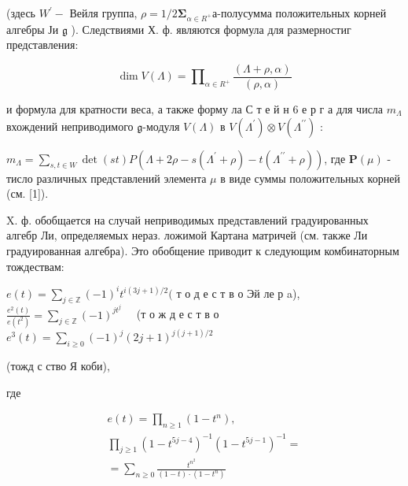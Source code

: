 \documentclass[10pt]{article}
\begin{document}
(здесь $W^{\prime}-$ Вейля группа, $\rho=1 / 2 \boldsymbol{\Sigma}_{\alpha \in R^{+}}$а-полусумма положительных корней алгебры Ји $\mathfrak{g}$ ). Следствиями Х. ф. являются формула для размерностиг представления:



\[

\operatorname{dim} V(\Lambda)=\mathbb{\prod}_{\alpha \in R^{+}} \frac{(\Lambda+\rho, \alpha)}{(\rho, \alpha)}

\]



и формула для кратности веса, а также форму ла С т е й н 6 е р г а для числа $m_{\Lambda}$ вхождений неприводимого $\mathfrak{g}$-модуля $V(\Lambda)$ в $V\left(\Lambda^{\prime}\right) \otimes V\left(\Lambda^{\prime \prime}\right)$ :



$m_{\Lambda}=\sum_{s, t \in W} \operatorname{det}(s t) P\left(\Lambda+2 \rho-s\left(\Lambda^{\prime}+\rho\right)-t\left(\Lambda^{\prime \prime}+\rho\right)\right)$, где $\boldsymbol{P}(\mu)$ - тисло различных представлений элемента $\mu$ в виде суммы положительных корней (см. [1]).



X. ф. обобщается на случай неприводимых представлений градуированных алгебр Ли, определяемых нераз. ложимой Картана матричей (см. также Ли градуированная алгебра). Это обобщение приводит к следующим комбинаторным тождествам:



$e(t)=\sum_{j \in \mathbb{Z}}(-1)^{i} t^{i(3 j+1) / 2}($ т о д е с т в о Эй ле р a), $\frac{e^{2}(t)}{e\left(t^{2}\right)}=\sum_{j \in \mathbb{Z}}(-1)^{j t^{j}} \quad$ (т о ж д е с т в о $e^{3}(t)=\sum_{i \geqslant 0}(-1)^{j}(2 j+1)^{j(j+1) / 2}$



(тожд с ство Я коби),



где



\[

\begin{gathered}

e(t)=\prod_{n \geqslant 1}\left(1-t^{n}\right), \\

\prod_{j \geqslant 1}\left(1-t^{5 j-4}\right)^{-1}\left(1-t^{5 j-1}\right)^{-1}= \\

=\sum_{n \geqslant 0} \frac{t^{n^{2}}}{(1-t) \cdot\left(1-t^{n}\right)}

\end{gathered}

\]
\end{document}
